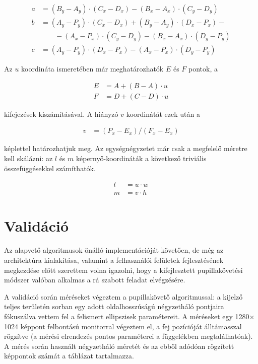 \begin{align}\label{eq:calib_2}
a &= (B_y - A_y) \cdot (C_x - D_x) - (B_x - A_x) \cdot (C_y - D_y) \nonumber \\
b &= (A_y - P_y) \cdot (C_x - D_x) + (B_y - A_y) \cdot (D_x - P_x) - \nonumber \\ 
  & \qquad - (A_x - P_x) \cdot (C_y - D_y) - (B_x - A_x) \cdot (D_y - P_y) \nonumber \\
c &= (A_y - P_y) \cdot (D_x - P_x) - (A_x - P_x) \cdot (D_y - P_y)
\end{align}

Az $u$ koordináta ismeretében már meghatározhatók $E$ és $F$ pontok, a

\begin{align}\label{eq:calib_3}
E &= A + (B-A) \cdot u \nonumber \\
F &= D + (C-D) \cdot u
\end{align}

kifejezések kiszámításával. A hiányzó $v$ koordinátát ezek után a 

\begin{align}\label{eq:calib_4}
v &= (P_x - E_x) / (F_x - E_x)
\end{align}

képlettel határozhatjuk meg. Az egységnégyzetet már csak a megfelelő méretre kell skálázni: az $l$ és $m$ képernyő-koordináták a következő triviális összefüggésekkel számíthatók.

\begin{align}\label{eq:calib_5}
l &= u \cdot w \nonumber \\
m &= v \cdot h
\end{align}

\section{Validáció}\label{sect:validacio}

Az alapvető algoritmusok önálló implementációját követően, de még az architektúra kialakítása, valamint a felhasználói felületek fejlesztésének megkezdése előtt szerettem volna igazolni, hogy a kifejlesztett pupillakövetési módszer valóban alkalmas a rá szabott feladat elvégzésére.

A validáció során méréseket végeztem a pupillakövető algoritmussal: a kijelző teljes területén sorban egy adott oldalhosszúságú négyzetháló pontjaira fókuszálva vettem fel a felismert ellipszisek paramétereit. A méréseket egy 1280$\times$1024 képpont felbontású monitorral végeztem el, a fej pozícióját álltámasszal rögzítve (a mérési elrendezés pontos paraméterei a  függelékben megtalálhatóak). A mérés során használt négyzetháló méretét és az ebből adódóan rögzített képpontok számát a  táblázat tartalmazza.

